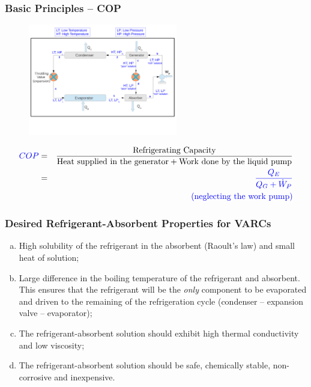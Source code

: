 \documentclass[10pt,compress]{beamer}
\newcommand{\frc}{\displaystyle\frac}
\begin{document}
\begin{frame} 
 \frametitle{Basic Principles -- COP} 
    \begin{figure}%
      \includegraphics[width=6.5cm,height=4.cm,clip]{./Pics/Overview_Refrig32}
    \end{figure}  

   \begin{eqnarray}
    \textcolor{blue}{COP} &=& \frc{\text{Refrigerating Capacity}}{\text{Heat supplied in the generator}+\text{Work done by the liquid pump}} \nonumber \\
                          &=& \textcolor{blue}{\frc{Q_{E}}{Q_{G}+\dot{W}_{P}}} \nonumber   \\
                          && \textcolor{blue}{\text{(neglecting the work pump)}} \nonumber
   \end{eqnarray}
\end{frame}

\begin{frame} 
 \frametitle{Desired Refrigerant-Absorbent Properties for VARCs} 
 \begin{enumerate}[(a)]
  \item <1-> High solubility of the refrigerant in the absorbent (Raoult's law) and small heat of solution;
  \item <2-> Large difference in the boiling temperature of the refrigerant and absorbent. This ensures that the refrigerant will be the {\it only} component to be evaporated and driven to the remaining of the refrigeration cycle (condenser -- expansion valve -- evaporator);
  \item <3-> The refrigerant-absorbent solution should exhibit high thermal conductivity and low viscosity;
  \item <4-> The refrigerant-absorbent solution should be safe, chemically stable, non-corrosive and inexpensive.
 \end{enumerate}
\end{frame}
\end{document}
